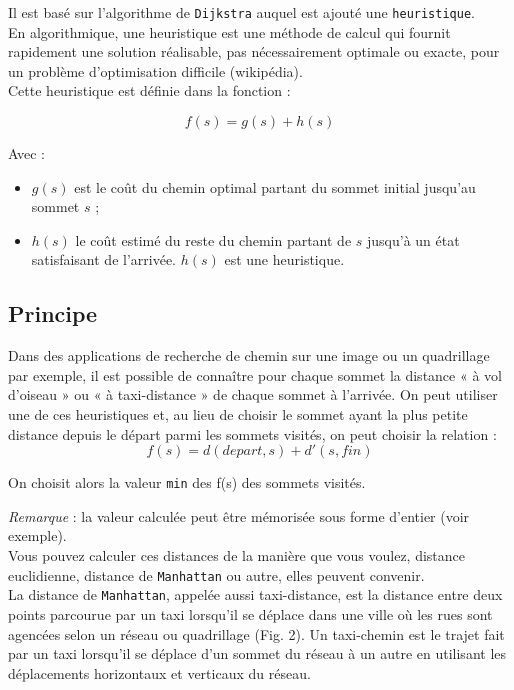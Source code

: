 Il est basé sur l'algorithme de \texttt{Dijkstra} auquel est ajouté une \texttt{heuristique}.\\

En algorithmique, une heuristique est une méthode de calcul qui fournit rapidement une solution réalisable, pas nécessairement optimale ou exacte, pour un problème d'optimisation difficile (wikipédia).\\

Cette heuristique est définie dans la fonction :

$$f(s)=g(s)+h(s) $$

Avec :
\begin{itemize}
\item $g(s)$ est le coût du chemin optimal partant du sommet initial jusqu'au sommet $s$ ;
\item $h(s)$ le coût estimé du reste du chemin partant de $s$ jusqu'à un état satisfaisant de l'arrivée. $h(s)$ est une heuristique.
\end{itemize}

\subsection{Principe}

Dans des applications de recherche de chemin sur une image ou un quadrillage par exemple, il est possible de connaître pour chaque sommet la distance « à vol d'oiseau » ou « à taxi-distance » de chaque sommet à l'arrivée. On peut utiliser une de ces heuristiques et, au lieu de choisir le sommet ayant la plus petite distance depuis le départ parmi les sommets visités, on peut choisir la relation :
$$f(s)=d(depart,s)+d'(s,fin) $$

On choisit alors la valeur \texttt{min} des f(s) des sommets visités.

\textit{Remarque} : la valeur calculée peut être mémorisée sous forme d'entier (voir exemple).\\

Vous pouvez calculer ces distances de la manière que vous voulez, distance euclidienne, distance de \texttt{Manhattan} ou autre, elles peuvent convenir.\\
La distance de \texttt{Manhattan}, appelée aussi taxi-distance, est la distance entre deux points parcourue par un taxi lorsqu'il se déplace dans une ville où les rues sont agencées selon un réseau ou quadrillage (Fig. 2). Un taxi-chemin est le trajet fait par un taxi lorsqu'il se déplace d'un sommet du réseau à un autre en utilisant les déplacements horizontaux et verticaux du réseau.

